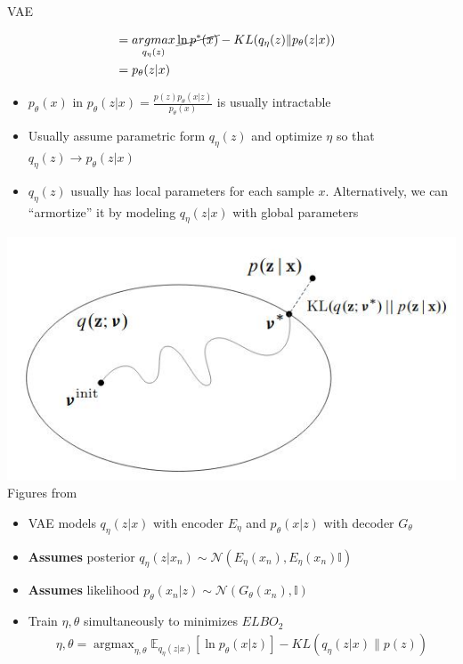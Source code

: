 \documentclass[compress]{beamer}
\newcommand{\expects}[2]{\mathbb{E}_{#1} \left[ #2 \right]}
\begin{document}
\begin{frame}[allowframebreaks]{VAE}
\begin{itemize}
\begin{itemize}
\begin{align*}
                                    &  =  \mathop{argmax}_{q_\eta(z)} \cancel{\ln p^*(x)} - KL(q_{\eta}(z)\|p_{\theta}(z|x)) & \\ 
                                    & = p_{\theta}(z|x) & \\
                    \end{align*}
            \end{itemize}
    \end{itemize}
    \framebreak
    \begin{itemize}
        \item $p_{\theta}(x)$ in $p_{\theta}(z|x)= \frac{p(z)p_{\theta}(x|z)}{p_\theta(x)} $ is usually intractable
        \item Usually assume parametric form $q_{\eta}(z)$ and optimize $\eta$ so that $q_{\eta}(z)\rightarrow p_\theta(z|x)$
        \item $q_\eta(z)$ usually has local parameters for each sample $x$. Alternatively, we can ``armortize'' it by modeling $q_\eta(z|x)$ with global parameters
    \end{itemize}
    \includegraphics[scale=0.5]{vae}
    {
        \tiny{Figures from \cite{blei2016variational}}
    }
    \framebreak

    \begin{itemize}
        \item VAE models $q_{\eta}(z|x)$ with encoder $E_{\eta}$ and $p_{\theta}(x|z)$  with decoder $G_{\theta}$ 
        \item \textbf{Assumes} posterior $q_{\eta}(z|x_n) \sim \mathcal{N}(E_{\eta}(x_n), E_{\eta}(x_n) \mathbb{I})$
        \item \textbf{Assumes} likelihood $p_{\theta}(x_n|z) \sim \mathcal{N}(G_{\theta}(x_n), \mathbb{I})$
        \item Train $\eta, \theta$ simultaneously to minimizes $ELBO_2$
            \begin{align*}
                \eta, \theta = \mathop{argmax}_{\eta, \theta} \expects{q_{\eta}(z|x)}{\ln p_{\theta}(x|z)} - KL(q_{\eta}(z|x)\|p(z))
            \end{align*}
                

\end{itemize}
\end{frame}
\end{document}
